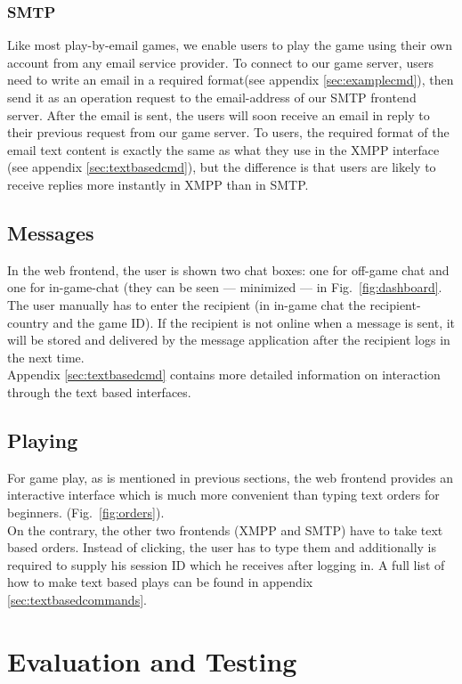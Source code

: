 \documentclass[11pt,a4paper]{report}
\newcommand{\hi}[1]{{\color{red}\em #1\/}\\}
\begin{document}
\subsection{SMTP}
Like most play-by-email games, we enable users to play the game using their own
account from any email service provider.
To connect to our game server, users need to write an email in a required
format(see appendix \ref{sec:examplecmd}),
then send it as an operation request to the email-address of our SMTP frontend
server. After the email is sent, the users will soon receive an email in reply
to their previous request from our game server. To users, the required format
of the email text content is exactly the same as what they use in the XMPP
interface (see appendix \ref{sec:textbasedcmd}), but the difference is that
users are likely to receive replies more instantly in XMPP than in SMTP.

\section{Messages}
In the web frontend, the user is shown two chat boxes: one for off-game chat
and one for in-game-chat (they can be seen --- minimized --- in
Fig.~\ref{fig:dashboard}. The user manually has to enter the recipient (in
in-game chat the recipient-country and the game ID). If the recipient is not
online when a message is sent, it will be stored and delivered by the message
application after the recipient logs in the next time. \\
Appendix \ref{sec:textbasedcmd} contains more detailed information on
interaction through the text based interfaces.

\section{Playing}
For game play, as is mentioned in previous sections, the web frontend provides
an interactive interface which is much more convenient than typing text orders
for beginners. (Fig.~\ref{fig:orders}). \\
On the contrary, the other two frontends (XMPP and SMTP) have to take text
based orders. Instead of clicking, the user has to type them and additionally
is required to supply his session ID which he receives after logging in.
A full list of how to make text based plays can be found in appendix
\ref{sec:textbasedcommands}.

\chapter{Evaluation and Testing}
\end{document}
